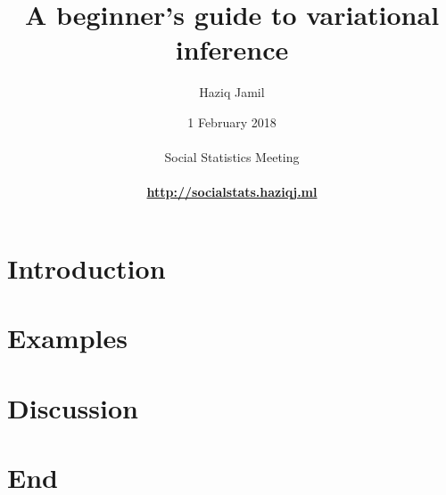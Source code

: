 \documentclass[]{beamer}
\begin{document}

\title[Variational inference]{A beginner's guide to variational inference}
\author[Haziq Jamil]{
  \large{Haziq Jamil}\\ 
}
\date[1 Feb 2018]{
  1 February 2018\\
  \hspace{1cm}\\
  Social Statistics Meeting\\
  \hspace{1cm}\\
  \href{http://socialstats.haziqj.ml}{\color{fu-red!60} \textbf{http://socialstats.haziqj.ml}}
}

\mytitle


\mytoc


\section{Introduction}
%

\section[Examples]{Examples}
\transition
%

\section{Discussion}
\transition


\section*{End}
\thankyou
\end{document}
